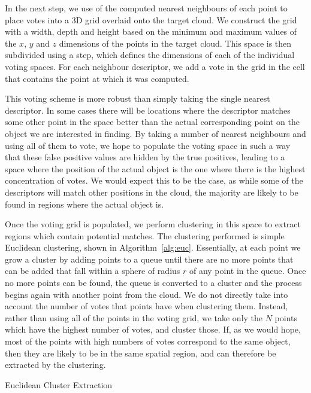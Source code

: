 \documentclass[11pt,a4paper]{kth-mag}
\begin{document}
In the next step, we use of the computed nearest neighbours of each point to
place votes into a 3D grid overlaid onto the target cloud. We construct the grid
with a width, depth and height based on the minimum and maximum values of the
$x$, $y$ and $z$ dimensions of the points in the target cloud. This space is
then subdivided using a step, which defines the dimensions of each of the
individual voting spaces. For each neighbour descriptor, we add a vote in the
grid in the cell that contains the point at which it was computed.

This voting scheme is more robust than simply taking the single nearest
descriptor. In some cases there will be locations where the descriptor matches
some other point in the space better than the actual corresponding point on the
object we are interested in finding. By taking a number of nearest neighbours
and using all of them to vote, we hope to populate the voting space in such a
way that these false positive values are hidden by the true positives, leading
to a space where the position of the actual object is the one where there is the
highest concentration of votes. We would expect this to be the case, as while
some of the descriptors will match other positions in the cloud, the majority
are likely to be found in regions where the actual object is.

Once the voting grid is populated, we perform clustering in this space to
extract regions which contain potential matches. The clustering performed is
simple Euclidean clustering, shown in Algorithm~\ref{alg:euc}. Essentially, at
each point we grow a cluster by adding points to a queue until there are no more
points that can be added that fall within a sphere of radius $r$ of any point in
the queue. Once no more points can be found, the queue is converted to a cluster
and the process begins again with another point from the cloud. We do not
directly take into account the number of votes that points have when clustering
them. Instead, rather than using all of the points in the voting grid, we take
only the $N$ points which have the highest number of votes, and cluster those.
If, as we would hope, most of the points with high numbers of votes correspond
to the same object, then they are likely to be in the same spatial region, and
can therefore be extracted by the clustering.

\begin{algorithm}
  \DontPrintSemicolon
  \caption{Euclidean Cluster Extraction \cite{RusuDoctoralDissertation}}
  \label{alg:euc}
\end{algorithm}
\end{document}

